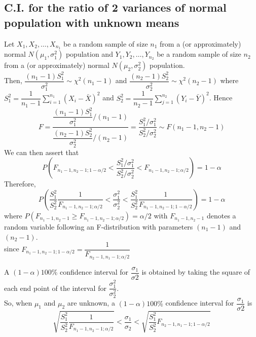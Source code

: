 \subsection{C.I. for the ratio of 2 variances of normal population with unknown means}
Let $X_1, X_2, \dots, X_{n_1}$ be a random sample of size $n_1$ from a (or approximately) normal $N(\mu_1, \sigma_1^2)$ population and $Y_1, Y_2, \dots, Y_{n_2}$ be a random sample of size $n_2$ from a (or approximately) normal $N(\mu_2, \sigma_2^2)$ population. \\
Then, $\dfrac{(n_1 - 1)S_1^2}{\sigma_1^2} \sim \chi^2(n_1 - 1)$ and $\dfrac{(n_2 - 1)S_2^2}{\sigma_2^2} \sim \chi^2(n_2 - 1)$ where $S_1^2 = \dfrac{1}{n_1 - 1} \sum_{i = 1}^{n_1} (X_i - \bar{X})^2$ and $S_2^2 = \dfrac{1}{n_2 - 1} \sum_{j = 1}^{n_2} (Y_i - \bar{Y})^2$.
Hence
$$
F = \dfrac{\dfrac{(n_1 - 1)S_1^2}{\sigma_1^2} / (n_1 - 1)}{\dfrac{(n_2 - 1)S_2^2}{\sigma_2^2} / (n_2 - 1)} = \dfrac{S_1^2/\sigma_1^2}{S_2^2/\sigma_2^2} \sim F(n_1 - 1, n_2 - 1)
$$
We can then assert that
$$
P\left(F_{n_1 -1, n_2 - 1; 1 - \alpha/2} < \dfrac{S_1^2/\sigma_1^2}{S_2^2/\sigma_2^2} < F_{n_1 -1, n_2 - 1;\alpha/2}
\right) = 1 - \alpha
$$
Therefore,
$$
P\left( \dfrac{S_1^2}{S_2^2} \dfrac{1}{F_{n_1 -1, n_2 - 1;\alpha/2}} < \dfrac{\sigma_1^2}{\sigma_2^2} < \dfrac{S_1^2}{S_2^2} \dfrac{1}{F_{n_1 -1, n_2 - 1;1 - \alpha/2}}
\right) = 1 - \alpha
$$
where $P(F_{n_1 -1, n_2 - 1} \geq F_{n_1 -1, n_2 - 1;\alpha/2}) = \alpha/2$ with $F_{n_1 -1, n_2 - 1}$ denotes a random variable following an F-distribution with parameters $(n_1 - 1)$ and $(n_2 - 1)$. \\
since $F_{n_1 - 1, n_2 - 1; 1 - \alpha/2} = \dfrac{1}{F_{n_2 - 1, n_1 - 1; \alpha/2}}$

\begin{note}
\end{note}
A $(1 - \alpha)100\%$ confidence interval for $\dfrac{\sigma_1}{\sigma2}$ is obtained by taking the square of each end point of the interval for $\dfrac{\sigma_1^2}{\sigma_2^2}$. \\
So, when $\mu_1$ and $\mu_2$ are unknown, a $(1 - \alpha)100\%$ confidence interval for $\dfrac{\sigma_1}{\sigma2}$ is
$$
\sqrt{\dfrac{S_1^2}{S_2^2} \dfrac{1}{F_{n_1 -1, n_2 - 1;\alpha/2}}} < \dfrac{\sigma_1}{\sigma_2} < \sqrt{\dfrac{S_1^2}{S_2^2} F_{n_2 -1, n_1 - 1;1 - \alpha/2}}
$$